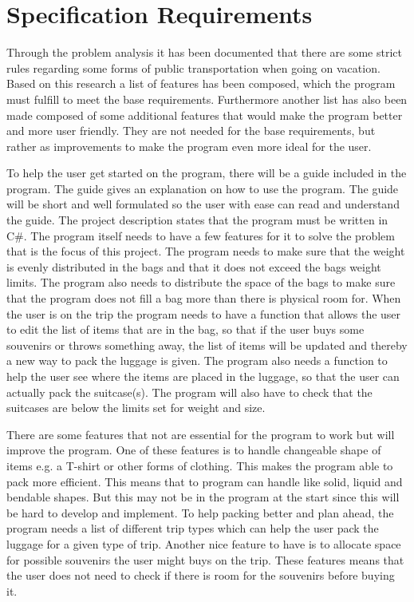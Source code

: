 \section{Specification Requirements}
\label{sec:Spec}
Through the problem analysis it has been documented that there are some strict rules regarding some forms of public transportation when going on vacation. Based on this research a list of features has been composed, which the program must fulfill to meet the base requirements.
Furthermore another list has also been made composed of some additional features that would make the program better and more user friendly. They are not needed for the base requirements, but rather as improvements to make the program even more ideal for the user.

To help the user get started on the program, there will be a guide included in the program. The guide gives an explanation on how to use the program. The guide will be short and well formulated so the user with ease can read and understand the guide.
The project description states that the program must be written in C\#.
The program itself needs to have a few features for it to solve the problem that is the focus of this project. The program needs to make sure that the weight is evenly distributed in the bags and that it does not exceed the bags weight limits. The program also needs to distribute the space of the bags to make sure that the program does not fill a bag more than there is physical room for.
When the user is on the trip the program needs to have a function that allows the user to edit the list of items that are in the bag, so that if the user buys some souvenirs or throws something away, the list of items will be updated and thereby a new way to pack the luggage is given.
The program also needs a function to help the user see where the items are placed in the luggage, so that the user can actually pack the suitcase(s).
The program will also have to check that the suitcases are below the limits set for weight and size.

There are some features that not are essential for the program to work but will improve the program. One of these features is to handle changeable shape of items e.g. a T-shirt or other forms of clothing. This makes the program able to pack more efficient. This means that to program can handle like solid, liquid and bendable shapes. But this may not be in the program at the start since this will be hard to develop and implement.
To help packing better and plan ahead, the program needs a list of different trip types which can help the user pack the luggage for a given type of trip.
Another nice feature to have is to allocate space for possible souvenirs the user might buys on the trip. These features means that the user does not need to check if there is room for the souvenirs before buying it.

